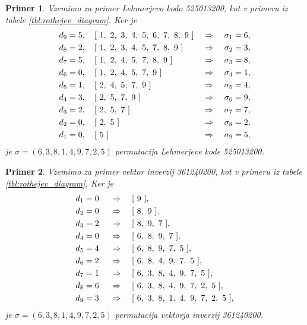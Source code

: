 \documentclass[a4paper, 12pt]{book}
\newtheorem{primer}{Primer}[chapter]
\begin{document}
\begin{primer}
\label{primer_lehmerjeva_koda_permutacija}
Vzemimo za primer Lehmerjevo kodo 525013200, kot v primeru iz tabele \ref{tbl:rothejev_diagram}. Ker je
\begin{align}
    &d_9 = 5, \quad [ \ 1, \ 2, \ 3, \ 4, \ 5, \ 6, \ 7, \ 8, \ 9 \ ]  \ &\Rightarrow& \ &\sigma_1 = 6, \notag \\
    &d_8 = 2, \quad [ \ 1, \ 2, \ 3, \ 4, \ 5, \ 7, \ 8, \ 9 \ ] \ &\Rightarrow& \ &\sigma_2 = 3, \notag \\
    &d_7 = 5, \quad [ \ 1, \ 2, \ 4, \ 5, \ 7, \ 8, \ 9 \ ] \ &\Rightarrow& \ &\sigma_3 = 8, \notag \\
    &d_6 = 0, \quad [ \ 1, \ 2, \ 4, \ 5, \ 7, \ 9 \ ] \ &\Rightarrow& \ &\sigma_4 = 1, \notag \\
    &d_5 = 1, \quad [ \ 2, \ 4, \ 5, \ 7, \ 9 \ ] \ &\Rightarrow& \ &\sigma_5 = 4, \notag \\
    &d_4 = 3, \quad [ \ 2, \ 5, \ 7, \ 9 \ ] \ &\Rightarrow& \ &\sigma_6 = 9, \notag \\
    &d_3 = 2, \quad [ \ 2, \ 5, \ 7 \ ] \ &\Rightarrow& \ &\sigma_7 = 7, \notag \\
    &d_2 = 0, \quad [ \ 2, \ 5 \ ] \ &\Rightarrow& \ &\sigma_8 = 2, \notag \\
    &d_1 = 0, \quad [ \ 5 \ ] \ &\Rightarrow& \ &\sigma_9 = 5, \notag
\end{align}
je $\sigma = (6, 3, 8, 1, 4, 9, 7, 2, 5)$ permutacija Lehmerjeve kode 525013200.
\end{primer}
\begin{primer}
\label{primer_vektor_inverzij_permutacija}
    Vzemimo za primer vektor inverzij 361240200, kot v primeru iz tabele \ref{tbl:rothejev_diagram}. Ker je
    \begin{align}
        &d_1 = 0& \ &\Rightarrow& \ &[ \ 9 \ ], \notag \\
        &d_2 = 0& \ &\Rightarrow& \ &[ \ 8, \ 9 \ ], \notag \\
        &d_3 = 2& \ &\Rightarrow& \ &[ \ 8, \ 9, \ 7 \ ], \notag \\
        &d_4 = 0& \ &\Rightarrow& \ &[ \ 6, \ 8, \ 9, \ 7 \ ], \notag \\
        &d_5 = 4& \ &\Rightarrow& \ &[ \ 6, \ 8, \ 9, \ 7, \ 5 \ ], \notag \\
        &d_6 = 2& \ &\Rightarrow& \ &[ \ 6, \ 8, \ 4, \ 9, \ 7, \ 5 \ ], \notag \\
        &d_7 = 1& \ &\Rightarrow& \ &[ \ 6, \ 3, \ 8, \ 4, \ 9, \ 7, \ 5 \ ], \notag \\
        &d_8 = 6& \ &\Rightarrow& \ &[ \ 6, \ 3, \ 8, \ 4, \ 9, \ 7, \ 2, \ 5 \ ], \notag \\
        &d_9 = 3& \ &\Rightarrow& \ &[ \ 6, \ 3, \ 8, \ 1, \ 4, \ 9, \ 7, \ 2, \ 5 \ ], \notag
    \end{align}
    je $\sigma = (6, 3, 8, 1, 4, 9, 7, 2, 5)$ permutacija vektorja inverzij 361240200.
\end{primer}
\end{document}
